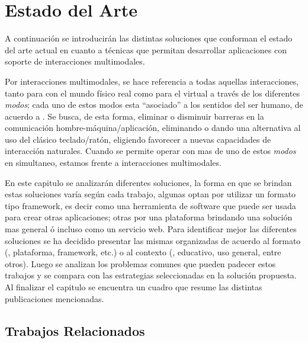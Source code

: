 
\chapter{Estado del Arte} %

\label{ch:estado_arte} %



A continuación se introducirán las distintas soluciones que conforman el estado del arte actual en cuanto a técnicas que permitan desarrollar aplicaciones con soporte de interacciones multimodales.

Por interacciones multimodales, se hace referencia a todas aquellas interacciones, tanto para con el mundo físico real como para el virtual a través de los diferentes \emph{modos}; cada uno de estos modos esta ``asociado'' a los sentidos del ser humano, de acuerdo a \citet{Bourguet2003}. Se busca, de esta forma, eliminar o disminuir barreras en la comunicación hombre-máquina/aplicación, \eg eliminando o dando una alternativa al uso del clásico teclado/ratón, eligiendo favorecer a nuevas capacidades de interacción naturales.
Cuando se permite operar con mas de uno de estos \emph{modos} en simultaneo, estamos frente a interacciones multimodales.

En este capitulo se analizarán diferentes soluciones, la forma en que se brindan estas soluciones varía según cada trabajo, algunas optan por utilizar un formato tipo framework, es decir como una herramienta de software que puede ser usada para crear otras aplicaciones; otras por una plataforma brindando una solución mas general ó incluso como un servicio web. Para identificar mejor las diferentes soluciones se ha decidido presentar las mismas organizadas de acuerdo al formato (\ie, plataforma, framework, etc.) o al contexto (\ie, educativo, uso general, entre otros). 
Luego se analizan los problemas comunes que pueden padecer estos trabajos y se compara con las estrategias seleccionadas en la solución propuesta. 
Al finalizar el capitulo se encuentra un cuadro que resume las distintas publicaciones mencionadas.


\section{Trabajos Relacionados} \label{sec:related_work} %

